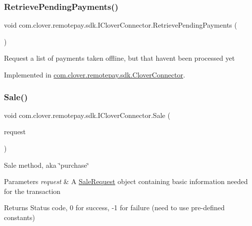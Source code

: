\subsubsection{\texorpdfstring{Retrieve\+Pending\+Payments()}{RetrievePendingPayments()}}
{\footnotesize\ttfamily void com.\+clover.\+remotepay.\+sdk.\+I\+Clover\+Connector.\+Retrieve\+Pending\+Payments (\begin{DoxyParamCaption}{ }\end{DoxyParamCaption})}



Request a list of payments taken offline, but that haven\textquotesingle{}t been processed yet 



Implemented in \hyperlink{classcom_1_1clover_1_1remotepay_1_1sdk_1_1_clover_connector_a8ba5ef9b937ad8edc9cd5052826da2ed}{com.\+clover.\+remotepay.\+sdk.\+Clover\+Connector}.

\mbox{\label{interfacecom_1_1clover_1_1remotepay_1_1sdk_1_1_i_clover_connector_acc92394e6902137c559510e498e78529}} 
\subsubsection{\texorpdfstring{Sale()}{Sale()}}
{\footnotesize\ttfamily void com.\+clover.\+remotepay.\+sdk.\+I\+Clover\+Connector.\+Sale (\begin{DoxyParamCaption}\item[{\hyperlink{classcom_1_1clover_1_1remotepay_1_1sdk_1_1_sale_request}{Sale\+Request}}]{request }\end{DoxyParamCaption})}



Sale method, aka \char`\"{}purchase\char`\"{} 


\begin{DoxyParams}{Parameters}
{\em request} & A \hyperlink{classcom_1_1clover_1_1remotepay_1_1sdk_1_1_sale_request}{Sale\+Request} object containing basic information needed for the transaction\\
\hline
\end{DoxyParams}
\begin{DoxyReturn}{Returns}
Status code, 0 for success, -\/1 for failure (need to use pre-\/defined constants)
\end{DoxyReturn}


